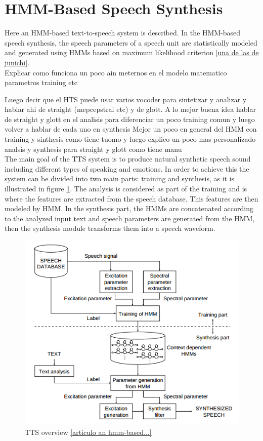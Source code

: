 \section{HMM-Based Speech Synthesis}\label{hmmbased}
Here an HMM-based text-to-speech system is described. In the HMM-based speech synthesis, the speech parameters of a speech unit are statistically modeled and generated using HMMs based on maximum likelihood criterion \ref{una de las de junichi}.\\

Explicar como funciona un poco ain meternos en el modelo matematico parametros training etc

Luego decir que el HTS puede usar varios vocoder para sintetizar y analizar y hablar ahi de straight (mepcepstral etc) y de glott.
 A lo mejor buena idea hablar de straight y glott en el analisis para diferenciar un poco training comun y luego volver a hablar de cada uno en synthesis
 Mejor un poco en general del HMM con training y sinthesis como tiene tuomo y luego explico un poco mas personalizado analsis y synthesis para straight y glott como tiene manu\\
 
The main goal of the TTS system is to produce natural synthetic speech sound including different types of speaking and emotions. In order to achieve this the system can be divided into two main parts: training and synthesis, as it is illustrated in figure \ref{ttsstruct}. The analysis is considered as part of the training and is where the features are extracted from the speech database. This features are then modeled by HMM. In the synthesis part, the HMMs are concatenated according to the analyzed input text and speech parameters are generated from the HMM, then the synthesis module transforms them into a speech waveform.\\
\begin{figure}[!htb]
	\begin{center}
	\includegraphics[width=1\textwidth]{img/ttsstruct.png}
	\end{center}
	\caption{\label{ttsstruct}TTS overview \ref{articulo an hmm-based...}}
\end{figure}
